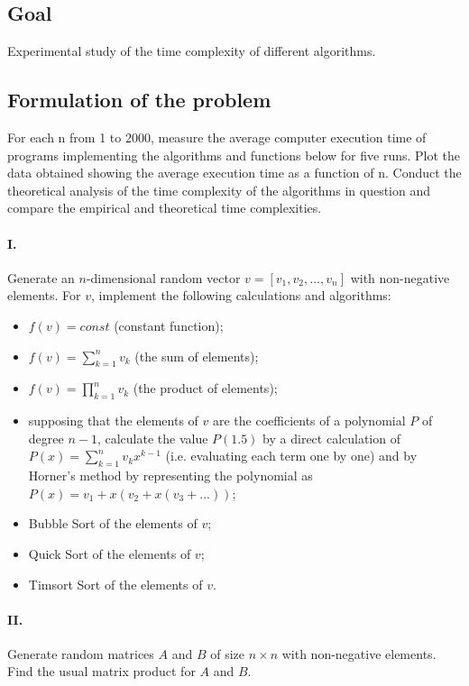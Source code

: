 \newpage
\subsection{Goal}

Experimental study of the time complexity of different algorithms.

\subsection{Formulation of the problem}

For each n from 1 to 2000, measure the average computer execution time of programs implementing the algorithms and functions below for five runs.
Plot the data obtained showing the average execution time as a function of n. Conduct the theoretical analysis of the time complexity of the algorithms in question and compare the empirical and theoretical time complexities.

\paragraph{I.}
Generate an $n$-dimensional random vector $v=[v_1,v_2,...,v_n]$ with non-negative elements.
For $v$, implement the following calculations and algorithms:
\begin{itemize}
    \item $f(v) = const$ (constant function);
    \item $f(v) = \sum^{n}_{k = 1}{v_k}$ (the sum of elements);
    \item $f(v) = \prod^{n}_{k = 1}{v_k}$ (the product of elements);
    \item supposing that the elements of $v$ are the coefficients of a polynomial $P$ of degree $n - 1$, calculate the value $P(1.5)$ by a direct calculation of $P(x) = \sum^{n}_{k = 1}{v_kx^{k - 1}}$ (i.e. evaluating each term one by one) and by Horner's method by representing the polynomial as $P(x) = v_1 + x(v_2 + x(v_3 + ...))$;
    \item Bubble Sort of the elements of $v$;
    \item Quick Sort of the elements of $v$;
    \item Timsort Sort of the elements of $v$.
\end{itemize}

\paragraph{II.}
Generate random matrices $A$ and $B$ of size $n \times n$ with non-negative elements. Find the usual matrix product for $A$ and $B$.

